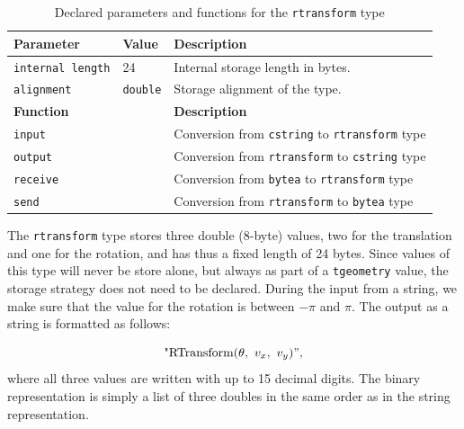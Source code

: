 \begin{table}[htb]
    \centering
    \begin{tabularx}{\textwidth}{|l|l|X|}
    \hline
    \textbf{Parameter}  & \textbf{Value}        & \textbf{Description} \\ 
    \hline
    \lstinline+internal length+     & 24                    & Internal storage length in bytes. \\
    \hline
    \lstinline+alignment+           & \lstinline+double+                & Storage alignment of the type. \\
    \hline
    \multicolumn{2}{|l|}{\textbf{Function}}     & \textbf{Description} \\ 
    \hline
    \multicolumn{2}{|l|}{\lstinline+input+}     & Conversion from \lstinline{cstring} to \lstinline{rtransform} type \\
    \hline
    \multicolumn{2}{|l|}{\lstinline+output+}    & Conversion from \lstinline{rtransform} to \lstinline{cstring} type \\
    \hline
    \multicolumn{2}{|l|}{\lstinline+receive+}               & Conversion from \lstinline{bytea} to \lstinline{rtransform} type \\
    \hline
    \multicolumn{2}{|l|}{\lstinline+send+}                  & Conversion from \lstinline{rtransform} to \lstinline{bytea} type \\
    \hline
    \end{tabularx}
    \caption{Declared parameters and functions for the \lstinline{rtransform} type}
    \label{table:rtransform_type_declaration}
\end{table}

The \lstinline+rtransform+ type stores three double (8-byte) values, two for the translation and one for the rotation, and has thus a fixed length of 24 bytes. Since values of this type will never be store alone, but always as part of a \lstinline+tgeometry+ value, the storage strategy does not need to be declared. During the input from a string, we make sure that the value for the rotation is between $-\pi$ and $\pi$. The output as a string is formatted as follows:

\[
    \text{"RTransform(}\theta,\ v_x,\ v_y{)"}, 
\]
where all three values are written with up to 15 decimal digits. The binary representation is simply a list of three doubles in the same order as in the string representation.

